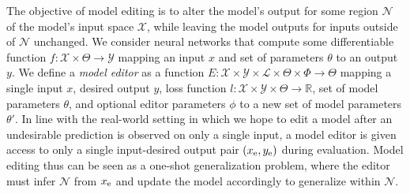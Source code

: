 \documentclass{article}
\begin{document}
The objective of model editing is to alter the model's output for some region $\mathcal{N}$ of the model's input space $\mathcal{X}$, while leaving the model outputs for inputs outside of $\mathcal{N}$ unchanged. We consider neural networks that compute some differentiable function $f: \mathcal{X} \times \Theta \rightarrow \mathcal{Y}$ mapping an input $x$ and set of parameters $\theta$ to an output $y$. We define a \textit{model editor} as a function $E : \mathcal{X} \times \mathcal{Y} \times \mathcal{L} \times \Theta \times \Phi \rightarrow \Theta$ mapping a single input $x$, desired output $y$, loss function $l:\mathcal{X} \times \mathcal{Y} \times \Theta \rightarrow \mathbb{R}$, set of model parameters $\theta$, and optional editor parameters $\phi$ to a new set of model parameters $\theta'$. In line with the real-world setting in which we hope to edit a model after an undesirable prediction is observed on only a single input, a model editor is given access to only a single input-desired output pair $(x_\text{e},y_\text{e})$ during evaluation. 
Model editing thus can be seen as a one-shot generalization problem, where the editor must infer $\mathcal{N}$ from $x_\text{e}$ and update the model accordingly to generalize within $\mathcal{N}$.
\end{document}
